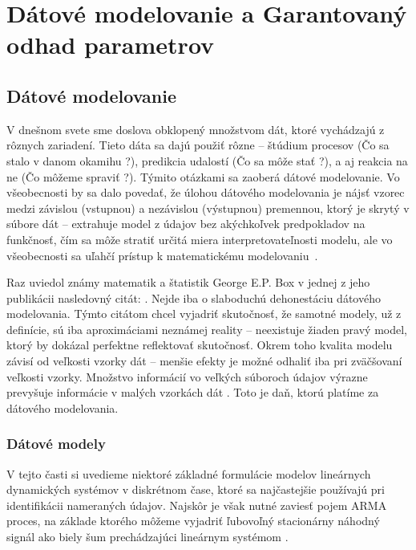 \part{Dátové modelovanie a Garantovaný odhad parametrov}
\chapter{Dátové modelovanie}
V dnešnom svete sme doslova obklopený množstvom dát, ktoré vychádzajú z rôznych zariadení.
Tieto dáta sa dajú použiť rôzne -- štúdium procesov
(Čo sa stalo v danom okamihu ?), predikcia udalostí (Čo sa môže stať ?), a aj reakcia na ne (Čo môžeme spraviť ?). Týmito otázkami sa zaoberá dátové modelovanie. Vo všeobecnosti by sa dalo povedať, že úlohou dátového modelovania je nájsť vzorec medzi závislou (vstupnou) a nezávislou (výstupnou) premennou, ktorý je skrytý v súbore dát
-- extrahuje model z údajov bez akýchkoľvek predpokladov na funkčnosť, čím sa môže stratiť určitá miera interpretovateľnosti modelu, ale vo všeobecnosti sa uľahčí prístup k matematickému 
modelovaniu~\cite{mishra:data_modeling:2018}.

Raz uviedol známy matematik a štatistik George E.P. Box  v jednej z jeho publikácii nasledovný citát:  \cite{box:sas:1976}. Nejde iba o slaboduchú dehonestáciu dátového modelovania. Týmto citátom chcel vyjadriť skutočnosť, že samotné modely, už z definície, sú iba aproximáciami neznámej reality
-- neexistuje žiaden pravý model, ktorý by dokázal perfektne reflektovať skutočnosť. Okrem toho kvalita modelu závisí od veľkosti vzorky dát -- menšie efekty je možné odhaliť iba pri zväčšovaní veľkosti vzorky. Množstvo informácií vo veľkých súboroch údajov výrazne prevyšuje informácie v malých vzorkách dát \cite{kenneth:understanding_stand_crit:2004}. Toto je daň, ktorú platíme za  dátového modelovania.

\section{Dátové modely}
V tejto časti si uvedieme niektoré základné formulácie modelov lineárnych dynamických systémov v diskrétnom čase, ktoré sa najčastejšie používajú pri identifikácii nameraných údajov. Najskôr je však nutné zaviesť pojem ARMA proces, na základe ktorého môžeme vyjadriť ľubovoľný stacionárny náhodný signál ako biely šum prechádzajúci lineárnym systémom \cite{fikar:identifikacia:1999}.

